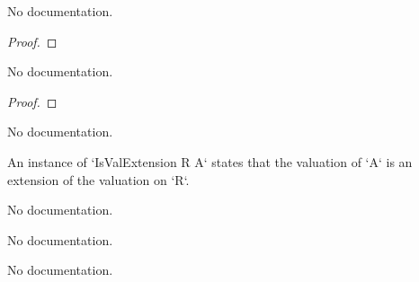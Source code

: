 \begin{theorem}\label{IsValExtension.val_map_le_one_iff}
        \leanok
                No documentation.
    \end{theorem}

\begin{proof}
    \leanok
\end{proof}

\begin{theorem}\label{IsValExtension.val_map_lt_one_iff}
        \leanok
                No documentation.
    \end{theorem}

\begin{proof}
    \leanok
\end{proof}

\begin{theorem}\label{IsValExtension.val_map_eq_one_iff}
                No documentation.
    \end{theorem}

\begin{definition}\label{IsValExtension}
        \leanok
                An instance of `IsValExtension R A` states that the valuation of `A` is an extension of the valuation on `R`.
    \end{definition}

\begin{definition}\label{IsValExtension.ofIntegerComap}
        \leanok
                No documentation.
    \end{definition}

\begin{definition}\label{IsValExtension.ofValuationSubringComap}
                No documentation.
    \end{definition}

\begin{theorem}\label{IsValExtension.coe_algebraMap_integer}
        \leanok
                No documentation.
    \end{theorem}

